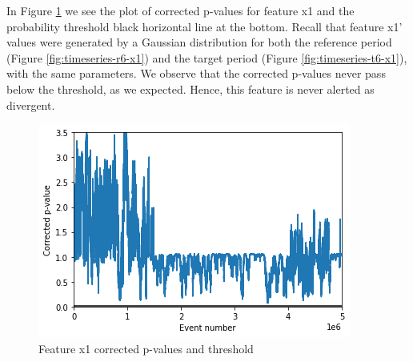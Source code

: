 In Figure \ref{fig:x1-corrected-pvalues} we see the plot of corrected p-values for feature x1 and the probability threshold black horizontal line at the bottom. Recall that feature x1' values were generated by a Gaussian distribution for both the reference period (Figure \ref{fig:timeseries-r6-x1}) and the target period (Figure \ref{fig:timeseries-t6-x1}), with the same parameters. We observe that the corrected p-values never pass below the threshold, as we expected. Hence, this feature is never alerted as divergent.
\begin{figure}[!htb]
    \begin{center}
      \includegraphics[scale=0.8]{figures/x1-corrected-pvalues.png}
      \caption{Feature x1 corrected p-values and threshold}
      \label{fig:x1-corrected-pvalues}
    \end{center}
\end{figure}

